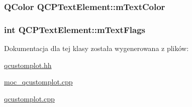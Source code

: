 \subsubsection[{\texorpdfstring{m\+Text\+Color}{mTextColor}}]{\setlength{\rightskip}{0pt plus 5cm}Q\+Color Q\+C\+P\+Text\+Element\+::m\+Text\+Color\hspace{0.3cm}{\ttfamily [protected]}}\hypertarget{class_q_c_p_text_element_a3685263a99eacd98b180d29adc8e8830}{}\label{class_q_c_p_text_element_a3685263a99eacd98b180d29adc8e8830}
\subsubsection[{\texorpdfstring{m\+Text\+Flags}{mTextFlags}}]{\setlength{\rightskip}{0pt plus 5cm}int Q\+C\+P\+Text\+Element\+::m\+Text\+Flags\hspace{0.3cm}{\ttfamily [protected]}}\hypertarget{class_q_c_p_text_element_a221eb95ecda1056eb79d56f1230f45d5}{}\label{class_q_c_p_text_element_a221eb95ecda1056eb79d56f1230f45d5}


Dokumentacja dla tej klasy została wygenerowana z plików\+:\begin{DoxyCompactItemize}
\item 
\hyperlink{qcustomplot_8hh}{qcustomplot.\+hh}\item 
\hyperlink{moc__qcustomplot_8cpp}{moc\+\_\+qcustomplot.\+cpp}\item 
\hyperlink{qcustomplot_8cpp}{qcustomplot.\+cpp}\end{DoxyCompactItemize}
